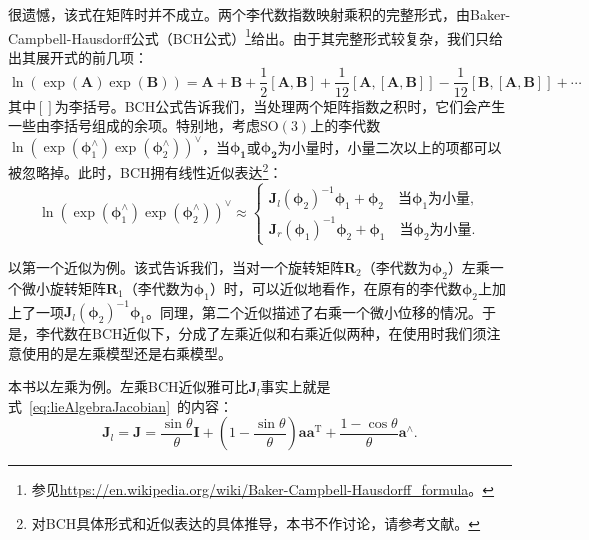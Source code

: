 很遗憾，该式在矩阵时并不成立。两个李代数指数映射乘积的完整形式，由Baker-Campbell-Hausdorff公式（BCH公式）\footnote{ 参见\url{https://en.wikipedia.org/wiki/Baker-Campbell-Hausdorff\_formula}。}给出。由于其完整形式较复杂，我们只给出其展开式的前几项：
\begin{equation}
\ln \left( {\exp \left( \bm{A} \right)\exp \left( \bm{B} \right)} \right) = \bm{A} + \bm{B} + \frac{1}{2}\left[ {\bm{A}, \bm{B}} \right] + \frac{1}{{12}}\left[ {\bm{A},\left[ {\bm{A}, \bm{B}} \right]} \right] - \frac{1}{{12}}\left[ {\bm{B},\left[ {\bm{A},\bm{B}} \right]} \right] +  \cdots 
\end{equation}
其中$[]$为李括号。BCH公式告诉我们，当处理两个矩阵指数之积时，它们会产生一些由李括号组成的余项。特别地，考虑$\mathrm{SO}(3)$上的李代数$\ln { \left( {\exp \left( { \bm{\phi} _1^ \wedge } \right)\exp \left( {\bm{\phi} _2^ \wedge } \right)} \right) ^ \vee }$，当$\bm{\phi_1}$或$\bm{\phi_2}$为小量时，小量二次以上的项都可以被忽略掉。此时，BCH拥有线性近似表达\footnote{对BCH具体形式和近似表达的具体推导，本书不作讨论，请参考文献\cite{Barfoot2016}。}：
\begin{equation}
 \ln { \left( {\exp \left( { \bm{\phi} _1^ \wedge } \right)\exp \left( {\bm{\phi} _2^ \wedge } \right)} \right) ^ \vee } \approx \left\{ 
 \begin{array}{l}
 {\bm{J}_l}{\left( {{\bm{\phi} _2}} \right)^{ - 1}}{ \bm{\phi} _1} + {\bm{\phi} _2} \quad \text{当} \bm{\phi}_1 \text{为小量},\\
 {\bm{J}_r}{\left( {{\bm{\phi} _1}} \right)^{ - 1}}{\bm{\phi} _2} + {\bm{\phi} _1} \quad \text{当} \bm{\phi}_2 \text{为小量}.
 \end{array} \right.
\end{equation}

以第一个近似为例。该式告诉我们，当对一个旋转矩阵$\bm{R}_2$（李代数为$\bm{\phi}_2$）左乘一个微小旋转矩阵$\bm{R}_1$（李代数为$\bm{\phi} _1$）时，可以近似地看作，在原有的李代数$\bm{\phi}_2$上加上了一项${\bm{J}_l}{\left( {{\bm{\phi} _2}} \right)^{ - 1}}{ \bm{\phi} _1}$。同理，第二个近似描述了右乘一个微小位移的情况。于是，李代数在BCH近似下，分成了左乘近似和右乘近似两种，在使用时我们须注意使用的是左乘模型还是右乘模型。

本书以左乘为例。左乘BCH近似雅可比$\bm{J}_l$事实上就是式~\eqref{eq:lieAlgebraJacobian}~的内容：
\begin{equation} 
{ \bm{J}_l} = \bm{J} = \frac{{\sin \theta }}{\theta } \bm{I} + \left( {1 - \frac{{\sin \theta }}{\theta }} \right) \bm{a} { \bm{a}^\mathrm{T}} + \frac{{1 - \cos \theta }}{\theta }{ \bm{a}^ \wedge}.
\end{equation}

